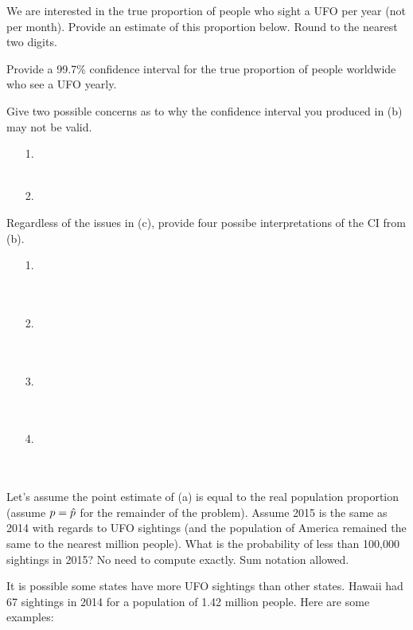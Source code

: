\documentclass[12pt]{article}
\begin{document}
\benum

 We are interested in the true proportion of people who sight a UFO per year (not per month). Provide an estimate of this proportion below. Round to the nearest two digits. 

 Provide a 99.7\% confidence interval for the true proportion of people worldwide who see a UFO yearly. 

 Give two possible concerns as to why the confidence interval you produced in (b) may not be valid.

\begin{enumerate}
\item [1.] ~\\~\\
\item [2.]
\end{enumerate}

 Regardless of the issues in (c), provide four possibe interpretations of the CI from (b).

\begin{enumerate}
\item [1.] ~\\~\\~\\
\item [2.]~\\~\\~\\
\item [3.]~\\~\\~\\
\item [4.]~\\~\\~\\
\end{enumerate}

 Let's assume the point estimate of (a) is equal to the real population proportion (assume $p = \hat{p}$ for the remainder of the problem). Assume 2015 is the same as 2014 with regards to UFO sightings (and the population of America remained the same to the nearest million people). What is the probability of less than 100,000 sightings in 2015? No need to compute exactly. Sum notation allowed.

 It is possible some states have more UFO sightings than other states. Hawaii had 67 sightings in 2014 for a population of 1.42 million people. Here are some examples:
\end{document}
